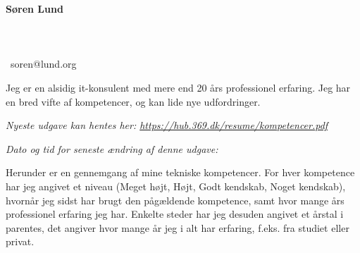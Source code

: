 \documentclass[a4paper,11pt]{article}
\newcommand\redacted{[skjult i online version]}
\newcommand\myaddressone{\redacted}
\newcommand\myaddresstwo{\redacted}
\newcommand\myphone{\redacted}
\begin{document}
\centerline{}
\centerline{}

\begin{minipage}[b]{0.30\textwidth}
  \selectfont%
  \textbf{Søren Lund} \\
  \myaddressone \\
  \myaddresstwo \\
  \myphone \\
  \Email\ soren@lund.org
\end{minipage}%
\hfill
\begin{minipage}[b]{0.30\textwidth}
  \selectfont%
  Jeg er en alsidig it-konsulent med
  mere end 20 års professionel
  erfaring. Jeg har en bred vifte af
  kompetencer, og
  kan lide nye udfordringer.
\end{minipage}

\bigskip
\centerline{\small\textit{Nyeste udgave kan hentes her: \url{https://hub.369.dk/resume/kompetencer.pdf}}}
\centerline{\small\textit{Dato og tid for seneste ændring af denne udgave: }}

\bigskip
\bigskip

\newcommand\High{Meget højt}
\newcommand\high{Højt}
\newcommand\know{Godt kendskab}
\newcommand\some{Noget kendskab}

Herunder er en gennemgang af mine tekniske kompetencer. For hver
kompetence har jeg angivet et niveau (\High, \high, \know, \some),
hvornår jeg sidst har brugt den pågældende kompetence, samt hvor
mange års professionel erfaring jeg har. Enkelte steder har jeg
desuden angivet et årstal i parentes, det angiver hvor mange år jeg i
alt har erfaring, f.eks. fra studiet eller privat.
\end{document}
